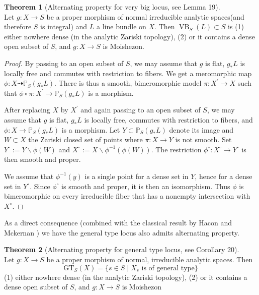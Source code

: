 \documentclass[11pt]{article}
\theoremstyle{definition}
\newtheorem{theorem}{Theorem}
\begin{document}
	\begin{theorem}[Alternating property for very big locus, see \cite{Moishezonmorphism} Lemma 19]\label{verybig}~\\
		 Let $g: X \rightarrow S$ be a proper morphism of normal irreducible analytic spaces(and therefore $S$ is integral)  and $L$ a line bundle on $X$. Then $\operatorname{VB}_S(L) \subset S$ is
		(1) either nowhere dense (in the analytic Zariski topology),
		(2) or it contains a dense open subset of $S$, and $g: X \rightarrow S$ is Moishezon.
	\end{theorem}
	\begin{proof}
	By passing to an open subset of $S$, we may assume that $g$ is flat, $g_* L$ is locally free and commutes with restriction to fibers. We get a meromorphic map $\phi: X \dashrightarrow \mathbb{P}_S\left(g_* L\right)$. There is thus a smooth, bimeromorphic model $\pi: X^{\prime} \rightarrow X$ such that $\phi \circ \pi: X^{\prime} \rightarrow \mathbb{P}_S\left(g_* L\right)$ is a morphism.
	
	After replacing $X$ by $X^{\prime}$ and again passing to an open subset of $S$, we may assume that $g$ is flat, $g_* L$ is locally free, commutes with restriction to fibers, and $\phi: X \rightarrow \mathbb{P}_S\left(g_* L\right)$ is a morphism. Let $Y \subset \mathbb{P}_S\left(g_* L\right)$ denote its image and $W \subset X$ the Zariski closed set of points where $\pi: X \rightarrow Y$ is not smooth. Set $Y^{\circ}:=Y \backslash \phi(W)$ and $X^{\circ}:=X \backslash \phi^{-1}(\phi(W))$. The restriction $\phi^{\circ}: X^{\circ} \rightarrow Y^{\circ}$ is then smooth and proper.
	
	We assume that $\phi^{-1}(y)$ is a single point for a dense set in $Y$, hence for a dense set in $Y^{\circ}$. Since $\phi^{\circ}$ is smooth and proper, it is then an isomorphism. Thus $\phi$ is bimeromorphic on every irreducible fiber that has a nonempty intersection with $X^{\circ}$.
	\end{proof}
	As a direct consequence (combined with the classical result by Hacon and Mckernan \cite{HaconMckernan}) we have the general type locus also admits alternating property.
	
	\begin{theorem}[Alternating property for general type locus, see \cite{Moishezonmorphism} Corollary 20]~\\
		Let $g: X \rightarrow S$ be a proper morphism of normal, irreducible analytic spaces. Then $$\text{GT}_S(X) = \{s\in S \mid X_s \text{ is of general type}\}$$(1) either nowhere dense (in the analytic Zariski topology),
		(2) or it contains a dense open subset of $S$, and $g: X \rightarrow S$ is Moishezon
	\end{theorem}
	
\end{document}

